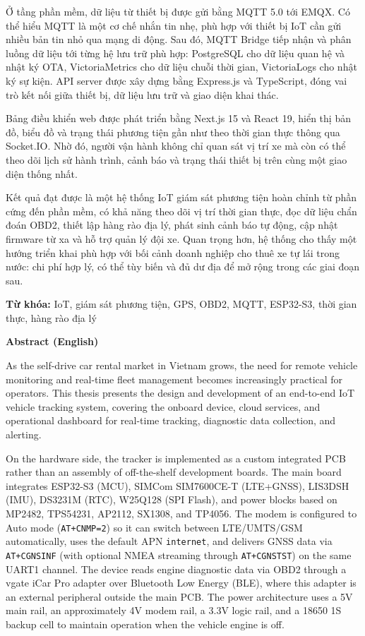 \documentclass[a4paper]{extarticle}
\begin{document}
Ở tầng phần mềm, dữ liệu từ thiết bị được gửi bằng MQTT 5.0 tới EMQX.
Có thể hiểu MQTT là một cơ chế nhắn tin nhẹ, phù hợp với thiết bị IoT
cần gửi nhiều bản tin nhỏ qua mạng di động. Sau đó, MQTT Bridge tiếp
nhận và phân luồng dữ liệu tới từng hệ lưu trữ phù hợp: PostgreSQL cho
dữ liệu quan hệ và nhật ký OTA, VictoriaMetrics cho dữ liệu chuỗi thời
gian, VictoriaLogs cho nhật ký sự kiện. API server được xây dựng bằng
Express.js và TypeScript, đóng vai trò kết nối giữa thiết bị, dữ liệu
lưu trữ và giao diện khai thác.

Bảng điều khiển web được phát triển bằng Next.js 15 và React 19, hiển
thị bản đồ, biểu đồ và trạng thái phương tiện gần như theo thời gian
thực thông qua Socket.IO. Nhờ đó, người vận hành không chỉ quan sát vị
trí xe mà còn có thể theo dõi lịch sử hành trình, cảnh báo và trạng thái
thiết bị trên cùng một giao diện thống nhất.

Kết quả đạt được là một hệ thống IoT giám sát phương tiện hoàn chỉnh từ
phần cứng đến phần mềm, có khả năng theo dõi vị trí thời gian thực, đọc
dữ liệu chẩn đoán OBD2, thiết lập hàng rào địa lý, phát sinh cảnh báo tự
động, cập nhật firmware từ xa và hỗ trợ quản lý đội xe. Quan trọng hơn,
hệ thống cho thấy một hướng triển khai phù hợp với bối cảnh doanh nghiệp
cho thuê xe tự lái trong nước: chi phí hợp lý, có thể tùy biến và đủ dư
địa để mở rộng trong các giai đoạn sau.

\textbf{Từ khóa:} IoT, giám sát phương tiện, GPS, OBD2, MQTT, ESP32-S3,
thời gian thực, hàng rào địa lý

\textbf{Abstract (English)}

As the self-drive car rental market in Vietnam grows, the need for
remote vehicle monitoring and real-time fleet management becomes
increasingly practical for operators. This thesis presents the design
and development of an end-to-end IoT vehicle tracking system, covering
the onboard device, cloud services, and operational dashboard for
real-time tracking, diagnostic data collection, and alerting.

On the hardware side, the tracker is implemented as a custom integrated
PCB rather than an assembly of off-the-shelf development boards. The
main board integrates ESP32-S3 (MCU), SIMCom SIM7600CE-T (LTE+GNSS),
LIS3DSH (IMU), DS3231M (RTC), W25Q128 (SPI Flash), and power blocks based
on MP2482, TPS54231, AP2112, SX1308, and TP4056. The modem is configured
to Auto mode (\texttt{AT+CNMP=2}) so it can switch between LTE/UMTS/GSM
automatically, uses the default APN \texttt{internet}, and delivers GNSS
data via \texttt{AT+CGNSINF} (with optional NMEA streaming through
\texttt{AT+CGNSTST}) on the same UART1 channel. The device reads engine
diagnostic data via OBD2 through a vgate iCar Pro adapter over Bluetooth
Low Energy (BLE), where this adapter is an external peripheral outside
the main PCB. The power architecture uses a 5V main rail, an
approximately 4V modem rail, a 3.3V logic rail, and a 18650 1S backup
cell to maintain operation when the vehicle engine is off.
\end{document}

